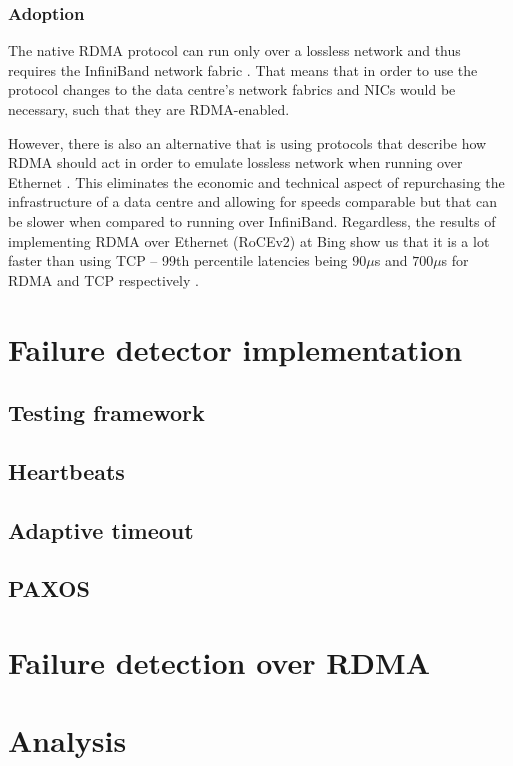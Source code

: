 \documentclass[bsc,frontabs,twoside,singlespacing,parskip,deptreport,hidel]{infthesis}     %
\begin{document}
\subsection{Adoption}
The native RDMA protocol can run only over a lossless network and thus requires the InfiniBand network fabric \cite{pfister2001infiniband}. That means that in order to use the protocol changes to the data centre's network fabrics and NICs would be necessary, such that they are RDMA-enabled.

However, there is also an alternative that is using protocols that describe how RDMA should act in order to emulate lossless network when running over Ethernet \cite{intel2015iwarp, mellanox2016roce, guo2016rdma}. This eliminates the economic and technical aspect of repurchasing the infrastructure of a data centre and allowing for speeds comparable but that can be slower when compared to running over InfiniBand. Regardless, the results of implementing RDMA over Ethernet (RoCEv2) at Bing show us that it is a lot faster than using TCP – 99th percentile latencies being  $90 \mu$s and  $700 \mu$s for RDMA and TCP respectively \cite{guo2016rdma}.

\chapter{Failure detector implementation}
\label{chap:failure_detector_impl}

\section{Testing framework}
\section{Heartbeats}
\section{Adaptive timeout}
\section{PAXOS}

\chapter{Failure detection over RDMA}
\label{chap:rdma_impl}

\chapter{Analysis}
\label{chap:analysis}
\end{document}
